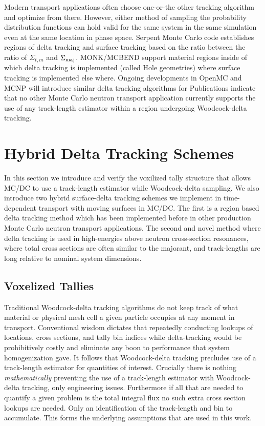 Modern transport applications often choose one-or-the other tracking algorithm and optimize from there. However, either method of sampling the probability distribution functions can hold valid for the same system in the same simulation even at the same location in phase space.
Serpent Monte Carlo code establishes regions of delta tracking and surface tracking based on the ratio between the ratio of $\Sigma_{t,m}$ and $\Sigma_{\text{maj}}$.
MONK/MCBEND support material regions inside of which delta tracking is implemented (called Hole geometries) where surface tracking is implemented else where.
Ongoing developments in OpenMC and MCNP will introduce similar delta tracking algorithms for 
Publications indicate that no other Monte Carlo neutron transport application currently supports the use of any track-length estimator within a region undergoing Woodcock-delta tracking.


\section{Hybrid Delta Tracking Schemes}

In this section we introduce and verify the voxilized tally structure that allows MC/DC to use a track-length estimator while Woodcock-delta sampling.
We also introduce two hybrid surface-delta tracking schemes we implement in time-dependent transport with moving surfaces in MC/DC.
The first is a region based delta tracking method which has been implemented before in other production Monte Carlo neutron transport applications.
The second and novel method where delta tracking is used in high-energies above neutron cross-section resonances, where total cross sections are often similar to the majorant, and track-lengths are long relative to nominal system dimensions.


\subsection{Voxelized Tallies}
\label{sec:voxtallies}

Traditional Woodcock-delta tracking algorithms do not keep track of what material or physical mesh cell a given particle occupies at any moment in transport.
Conventional wisdom dictates that repeatedly conducting lookups of locations, cross sections, and tally bin indices while delta-tracking would be prohibitively costly and eliminate any boon to performance that system homogenization gave.
It follows that Woodcock-delta tracking precludes use of a track-length estimator for quantities of interest.
Crucially there is nothing \textit{mathematically} preventing the use of a track-length estimator with Woodcock-delta tracking, only engineering issues.
Furthermore if all that are needed to quantify a given problem is the total integral flux no such extra cross section lookups are needed.
Only an identification of the track-length and bin to accumulate.
This forms the underlying assumptions that are used in this work.

